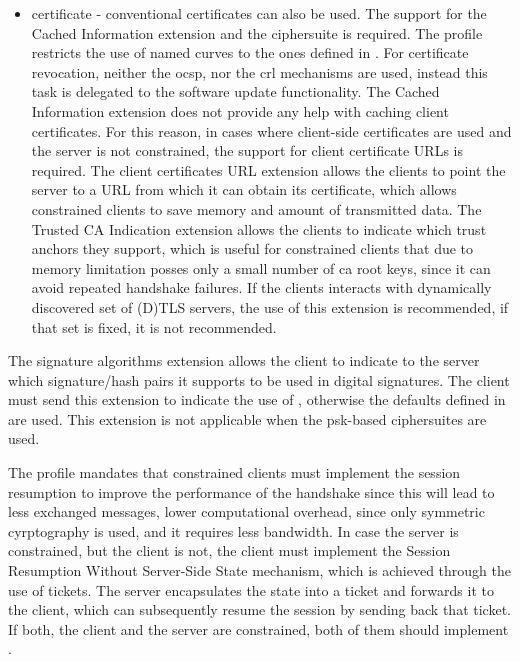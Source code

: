 \documentclass{llncs}
\begin{document}
\begin{itemize}
  \item certificate - conventional certificates can also be used. The support
  for the Cached Information extension\cite{RFC7924} and the 
  ciphersuite is required. The profile restricts the use of named curves to
  the ones defined in \cite{RFC4492}. For certificate revocation, neither the
  \gls{ocsp}\cite{RFC6960}, nor the \gls{crl}\cite{RFC5280} mechanisms are used, instead this task is delegated to
  the software update functionality. The Cached Information extension does not
  provide any help with caching client certificates. For this reason, in cases
  where client-side certificates are used and the server is not constrained,
  the support for client certificate URLs is required. The client certificates URL
  extension\cite{RFC4366} allows the clients to point the server to a URL from
  which it can obtain its certificate, which allows constrained clients to
  save memory and amount of transmitted data. The Trusted CA Indication\cite{RFC6066}
  extension allows the clients to indicate which trust anchors they support, which is useful
  for constrained clients that due to memory limitation posses only a small number
  of \gls{ca} root keys, since it can avoid repeated handshake failures. If the clients interacts with
  dynamically discovered set of (D)TLS servers, the use of this extension is recommended,
  if that set is fixed, it is not recommended.

\end{itemize}

The signature algorithms extension\cite{RFC5246} allows the client to indicate
to the server which signature/hash pairs it supports to be used in digital signatures.
The client must send this extension to indicate the use of ,
otherwise the defaults defined in \cite{RFC5246} are used. This extension is not
applicable when the \gls{psk}-based ciphersuites are used.

The profile mandates that constrained clients must implement the session
resumption to improve the performance of the handshake since this will lead to
less exchanged messages, lower computational overhead, since only symmetric cyrptography
is used, and it requires less bandwidth. In case the server is constrained, but
the client is not, the client must implement the Session Resumption Without
Server-Side State mechanism\cite{RFC5077}, which is achieved through the
use of tickets. The server encapsulates the state into a ticket and forwards it to
the client, which can subsequently resume the session by sending back that ticket.
If both, the client and the server are constrained, both of them should implement
\cite{RFC5077}.
\end{document}
